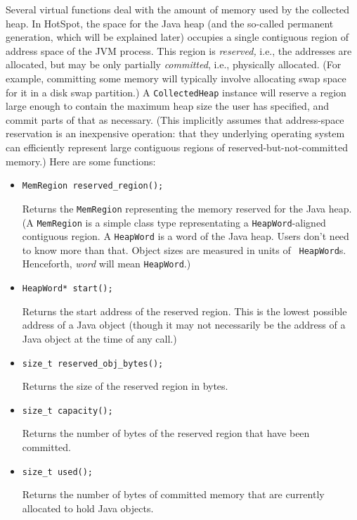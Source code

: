 \documentclass{article}
\begin{document}

Several virtual functions deal with the amount of memory used by the
collected heap.  In HotSpot, the space for the Java heap (and the
so-called permanent generation, which will be explained later)
occupies a single contiguous region of address space of the JVM
process.  This region is {\em reserved,} i.e., the addresses are
allocated, but may be only partially {\em committed}, i.e., physically
allocated.  (For example, committing some memory will typically
involve allocating swap space for it in a disk swap partition.)  A
{\tt CollectedHeap} instance will reserve a region large enough to contain
the maximum heap size the user has specified, and 
commit parts of that as necessary.  (This implicitly assumes that
address-space reservation is an inexpensive operation: that they
underlying operating system can efficiently represent large contiguous
regions of reserved-but-not-committed memory.)  Here are some
functions:


\begin{itemize}
\item {\tt MemRegion reserved\_region();}

Returns the {\tt MemRegion} representing
the memory reserved for the Java heap.  (A {\tt MemRegion} is a simple
class type representating a {\tt HeapWord}-aligned contiguous region.
A {\tt HeapWord} is a word of the Java heap.  Users don't need to know
more than that.  Object sizes are measured in units of {\tt
HeapWord}s.  Henceforth, {\em word} will mean {\tt HeapWord}.)

\item {\tt HeapWord* start();}

Returns the start address of the reserved region.
This is the lowest possible address of a Java object (though it may
not necessarily be the address of a Java object at the time of any
call.)

\item {\tt size\_t reserved\_obj\_bytes();}

Returns the size of the reserved
region in bytes.

\item {\tt size\_t capacity();}

Returns the number of bytes of the reserved
region that have been committed.

\item {\tt size\_t used();}

Returns the number of bytes of committed memory
that are currently allocated to hold Java objects.

\end{itemize}
\end{document}
